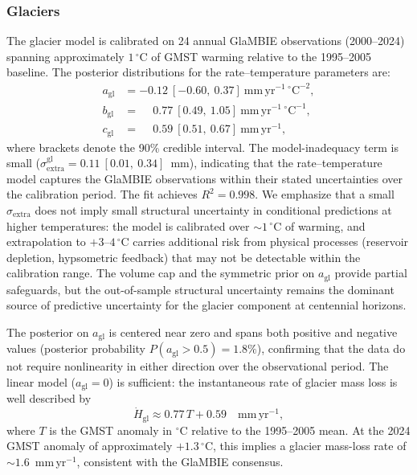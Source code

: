 \documentclass[11pt]{article}
\begin{document}
	\subsubsection{Glaciers}

The glacier model is calibrated on 24 annual GlaMBIE observations (2000--2024) spanning approximately $1\,^\circ$C of GMST warming relative to the 1995--2005 baseline. The posterior distributions for the rate--temperature parameters are:
\begin{align}
	a_{\mathrm{gl}} &= -0.12\ [-0.60,\ 0.37]\ \mathrm{mm\,yr^{-1}\,{^\circ C}^{-2}}, \label{eq:glacier_result_a} \\
	b_{\mathrm{gl}} &= \phantom{-}0.77\ [0.49,\ 1.05]\ \mathrm{mm\,yr^{-1}\,{^\circ C}^{-1}}, \label{eq:glacier_result_b} \\
	c_{\mathrm{gl}} &= \phantom{-}0.59\ [0.51,\ 0.67]\ \mathrm{mm\,yr^{-1}}, \label{eq:glacier_result_c}
\end{align}
where brackets denote the 90\% credible interval. The model-inadequacy term is small ($\sigma_{\mathrm{extra}}^{\mathrm{gl}} = 0.11\ [0.01,\ 0.34]$~mm), indicating that the rate--temperature model captures the GlaMBIE observations within their stated uncertainties over the calibration period. The fit achieves $R^2 = 0.998$. We emphasize that a small $\sigma_{\mathrm{extra}}$ does not imply small structural uncertainty in conditional predictions at higher temperatures: the model is calibrated over $\sim\!1\,^\circ$C of warming, and extrapolation to $+3$--$4\,^\circ$C carries additional risk from physical processes (reservoir depletion, hypsometric feedback) that may not be detectable within the calibration range. The volume cap and the symmetric prior on $a_{\mathrm{gl}}$ provide partial safeguards, but the out-of-sample structural uncertainty remains the dominant source of predictive uncertainty for the glacier component at centennial horizons.

The posterior on $a_{\mathrm{gl}}$ is centered near zero and spans both positive and negative values (posterior probability $P(a_{\mathrm{gl}} > 0.5) = 1.8\%$), confirming that the data do not require nonlinearity in either direction over the observational period. The linear model ($a_{\mathrm{gl}} = 0$) is sufficient: the instantaneous rate of glacier mass loss is well described by
\begin{equation}
	\dot{H}_{\mathrm{gl}} \approx 0.77\, T + 0.59 \quad \mathrm{mm\,yr^{-1}},
	\label{eq:glacier_linear_rate}
\end{equation}
where $T$ is the GMST anomaly in $^\circ$C relative to the 1995--2005 mean. At the 2024 GMST anomaly of approximately $+1.3\,^\circ$C, this implies a glacier mass-loss rate of $\sim\!1.6$~mm\,yr$^{-1}$, consistent with the GlaMBIE consensus.
\end{document}

